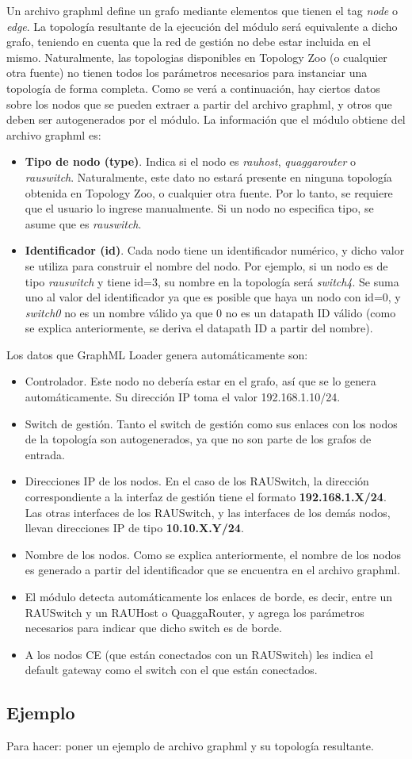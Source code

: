 Un archivo graphml define un grafo mediante elementos que tienen el tag \textit{node} o \textit{edge}. La topología resultante de la ejecución del módulo será equivalente a dicho grafo, teniendo en cuenta que la red de gestión no debe estar incluida en el mismo. Naturalmente, las topologias disponibles en Topology Zoo (o cualquier otra fuente) no tienen todos los parámetros necesarios para instanciar una topología de forma completa. Como se verá a continuación, hay ciertos datos sobre los nodos que se pueden extraer a partir del archivo graphml, y otros que deben ser autogenerados por el módulo. La información que el módulo obtiene del archivo graphml es:
\begin{itemize}
	\item \textbf{Tipo de nodo (type)}. Indica si el nodo es \textit{rauhost}, \textit{quaggarouter} o \textit{rauswitch}. Naturalmente, este dato no estará presente en ninguna topología obtenida en Topology Zoo, o cualquier otra fuente. Por lo tanto, se requiere que el usuario lo ingrese manualmente. Si un nodo no especifica tipo, se asume que es \textit{rauswitch}.
	\item \textbf{Identificador (id)}. Cada nodo tiene un identificador numérico, y dicho valor se utiliza para construir el nombre del nodo. Por ejemplo, si un nodo es de tipo \textit{rauswitch} y tiene id=3, su nombre en la topología será \textit{switch4}. Se suma uno al valor del identificador ya que es posible que haya un nodo con id=0, y \textit{switch0} no es un nombre válido ya que 0 no es un datapath ID válido (como se explica anteriormente, se deriva el datapath ID a partir del nombre).
\end{itemize}

Los datos que GraphML Loader genera automáticamente son:
\begin{itemize}
	\item Controlador. Este nodo no debería estar en el grafo, así que se lo genera automáticamente. Su dirección IP toma el valor 192.168.1.10/24.
	\item Switch de gestión. Tanto el switch de gestión como sus enlaces con los nodos de la topología son autogenerados, ya que no son parte de los grafos de entrada.
	\item Direcciones IP de los nodos. En el caso de los RAUSwitch, la dirección correspondiente a la interfaz de gestión tiene el formato \textbf{192.168.1.X/24}. Las otras interfaces de los RAUSwitch, y las interfaces de los demás nodos, llevan direcciones IP de tipo \textbf{10.10.X.Y/24}.
	\item Nombre de los nodos. Como se explica anteriormente, el nombre de los nodos es generado a partir del identificador que se encuentra en el archivo graphml.
	\item El módulo detecta automáticamente los enlaces de borde, es decir, entre un RAUSwitch y un RAUHost o QuaggaRouter, y agrega los parámetros necesarios para indicar que dicho switch es de borde.
	\item A los nodos CE (que están conectados con un RAUSwitch) les indica el default gateway como el switch con el que están conectados.
\end{itemize}

\subsection{Ejemplo}
Para hacer: poner un ejemplo de archivo graphml y su topología resultante.



